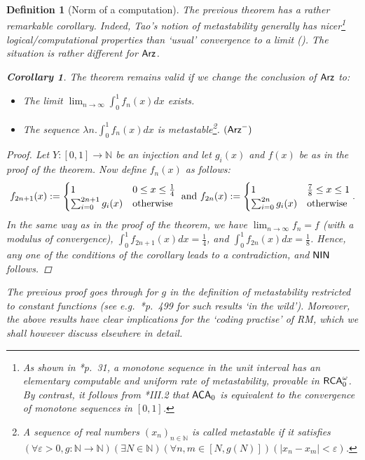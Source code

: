 \documentclass[reqno]{amsart}
\newtheorem{cor}[thm]{Corollary}
\newtheorem{defi}[thm]{Definition}
\def\RCAo{\textup{\textsf{RCA}}_{0}^{\omega}}
\def\N{{\mathbb  N}}
\def\di{\rightarrow}
\def\ACA{\textup{\textsf{ACA}}}
\def\Arz{\textup{\textsf{Arz}}}
\def\NIN{\textup{\textsf{NIN}}}
\def\eps{\varepsilon}
\numberwithin{equation}{section}
\numberwithin{thm}{section}
\begin{document}
\begin{defi}[Norm of a computation]
The previous theorem has a rather remarkable corollary.  Indeed, Tao's notion of metastability generally has nicer\footnote{As shown in \cite{kohlenbach3}*{p.\ 31}, a monotone sequence in the unit interval has an elementary computable and uniform rate of metastability, provable in $\RCAo$.  By contrast, it follows from \cite{simpson2}*{III.2} that $\ACA_{0}$ is equivalent to the convergence of monotone sequences in $[0,1]$.} 
logical/computational properties than `usual' convergence to a limit (\cite{taote, kohlenbach3}).   
The situation is rather different for $\Arz$.
\begin{cor}
The theorem remains valid if we change the conclusion of $\Arz$ to:
\begin{itemize}
\item The limit $\lim_{n\di \infty}\int_{0}^{1}f_{n}(x)dx$ exists.
\item The sequence $\lambda n.\int_{0}^{1}f_{n}(x)dx$ is metastable\footnote{A sequence of real numbers $(x_{n})_{n\in \N}$ is called \emph{metastable} if it satisfies $(\forall \eps>0, g:\N\di \N)(\exists N\in \N)(\forall n, m\in [N, g(N)])(|x_{n}-x_{m}|<\eps)$.}. $(\Arz^{-})$
\end{itemize}
\end{cor}
\begin{proof}
Let $Y:[0,1]\di \N$ be an injection and let $g_{i}(x)$ and $f(x)$ be as in the proof of the theorem.  Now define $f_{n}(x)$ as follows:
\[
f_{2n+1}(x):=
\begin{cases}
1 & 0\leq x\leq \frac{1}{4}\\
\sum_{i=0}^{2n+1} g_{i}(x) & \textup{otherwise}
\end{cases}
\textup{ and }
f_{2n}(x):=
\begin{cases}
1 & \frac{7}{8}\leq x\leq 1\\
\sum_{i=0}^{2n} g_{i}(x) & \textup{otherwise}
\end{cases}.
\]
In the same way as in the proof of the theorem, we have $\lim_{n\di \infty}f_{n}=f$ (with a modulus of convergence), $\int_{0}^{1}f_{2n+1}(x)dx =\frac{1}{4}$, and $\int_{0}^{1}f_{2n}(x)dx =\frac{1}{8}$.
Hence, any one of the conditions of the corollary leads to a contradiction, and $\NIN$ follows. 
\end{proof}
The previous proof goes through for $g$ in the definition of metastability restricted to constant functions (see e.g.\ \cite{kohlenbach3}*{p.\ 499} for such results `in the wild'). 
Moreover, the above results have clear implications for the `coding practise' of RM, which we shall however discuss elsewhere in detail. 


\end{defi}
\end{document}
